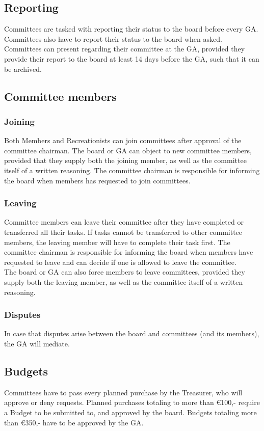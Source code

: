 \documentclass[a4paper]{article}
\begin{document}
\subsection{Reporting}
Committees are tasked with reporting their status to the board before every GA. Committees also have to report their status to the board when asked. Committees can present regarding their committee at the GA, provided they provide their report to the board at least 14 days before the GA, such that it can be archived.

\subsection{Committee members}
\subsubsection{Joining}
Both Members and Recreationists can join committees after approval of the committee chairman. The board or GA can object to new committee members, provided that they supply both the joining member, as well as the committee itself of a written reasoning. The committee chairman is responsible for informing the board when members has requested to join committees.

\subsubsection{Leaving}
Committee members can leave their committee after they have completed or transferred all their tasks. If tasks cannot be transferred to other committee members, the leaving member will have to complete their task first. The committee chairman is responsible for informing the board when members have requested to leave and can decide if one is allowed to leave the committee. \\ 

The board or GA can also force members to leave committees, provided they supply both the leaving member, as well as the committee itself of a written reasoning.

\subsubsection{Disputes}
In case that disputes arise between the board and committees (and its members), the GA will mediate.

\subsection{Budgets}
Committees have to pass every planned purchase by the Treasurer, who will approve or deny requests. Planned purchases totaling to more than €100,- require a Budget to be submitted to, and approved by the board. Budgets totaling more than €350,- have to be approved by the GA.
\end{document}
